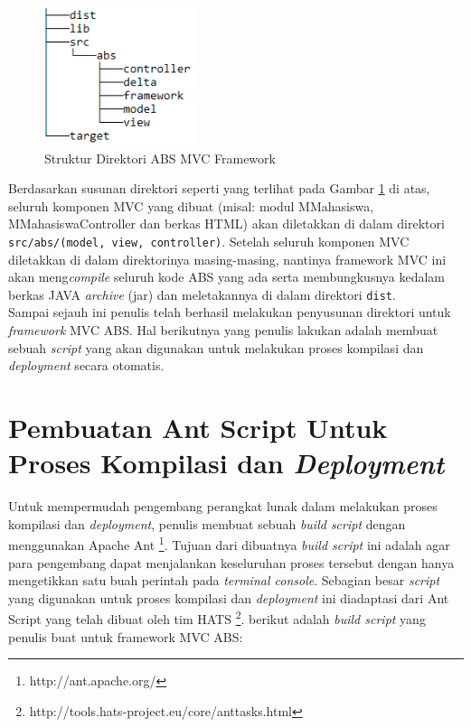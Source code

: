 \begin{figure}
    \centering
    \includegraphics[width=0.4\textwidth]
        {img/struktur-direktori.png}
    \caption{Struktur Direktori ABS MVC Framework}
    \label{fig:strukturDirektori}
\end{figure}

Berdasarkan susunan direktori seperti yang terlihat pada Gambar \ref{fig:strukturDirektori} di atas, seluruh komponen MVC yang dibuat (misal: modul MMahasiswa, MMahasiswaController dan berkas HTML) akan diletakkan di dalam direktori \texttt{src/abs/(model, view, controller)}. Setelah seluruh komponen MVC diletakkan di dalam direktorinya masing-masing, nantinya framework MVC ini akan meng\textit{compile} seluruh kode ABS yang ada serta membungkusnya kedalam berkas JAVA \textit{archive} (jar) dan meletakannya di dalam direktori \texttt{dist}.\\

Sampai sejauh ini penulis telah berhasil melakukan penyusunan direktori untuk \textit{framework} MVC ABS. Hal berikutnya yang penulis lakukan adalah membuat sebuah \textit{script} yang akan digunakan untuk melakukan proses kompilasi dan \textit{deployment} secara otomatis.

\section{Pembuatan Ant Script Untuk Proses Kompilasi dan \textit{Deployment}}

Untuk mempermudah pengembang perangkat lunak dalam melakukan proses kompilasi dan \textit{deployment}, penulis membuat sebuah \textit{build script} dengan menggunakan Apache Ant \footnote{http://ant.apache.org/}. Tujuan dari dibuatnya \textit{build script} ini adalah agar para pengembang dapat menjalankan keseluruhan proses tersebut dengan hanya mengetikkan satu buah perintah pada \textit{terminal console}. Sebagian besar \textit{script} yang digunakan untuk proses kompilasi dan \textit{deployment} ini diadaptasi dari Ant Script yang telah dibuat oleh tim HATS \footnote{http://tools.hats-project.eu/core/anttasks.html}. berikut adalah \textit{build script} yang penulis buat untuk framework MVC ABS:

